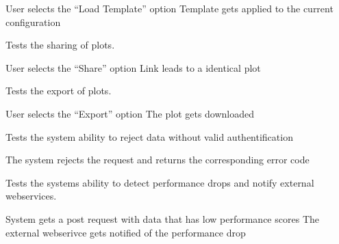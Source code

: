 {User selects the \enquote{Load Template} option}
{Template gets applied to the current configuration}


Tests the sharing of \glspl{plot}.

{User selects the \enquote{Share} option}
{Link leads to a identical \gls{plot}}


Tests the export of \glspl{plot}.

{User selects the \enquote{Export} option}
{The \gls{plot} gets downloaded}


Tests the system ability to reject data without valid authentification 

{The system rejects the request and returns the corresponding error code}


Tests the systems ability to detect performance drops and notify external webservices.

{System gets a post request with data that has low performance scores}
{The external webserivce gets notified of the performance drop}
